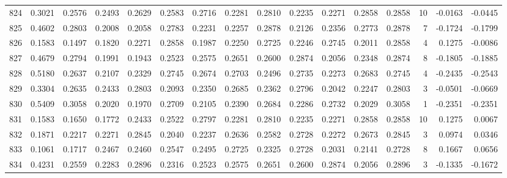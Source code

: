 \begin{tabular}{lrrrrrrrrrrrrrrr}
824 &      0.3021 &  0.2576 &  0.2493 &  0.2629 &  0.2583 &  0.2716 &  0.2281 &  0.2810 &  0.2235 &  0.2271 &   0.2858 &     0.2858 &     10 &                   -0.0163 &                    -0.0445 \\
825 &      0.4602 &  0.2803 &  0.2008 &  0.2058 &  0.2783 &  0.2231 &  0.2257 &  0.2878 &  0.2126 &  0.2356 &   0.2773 &     0.2878 &      7 &                   -0.1724 &                    -0.1799 \\
826 &      0.1583 &  0.1497 &  0.1820 &  0.2271 &  0.2858 &  0.1987 &  0.2250 &  0.2725 &  0.2246 &  0.2745 &   0.2011 &     0.2858 &      4 &                    0.1275 &                    -0.0086 \\
827 &      0.4679 &  0.2794 &  0.1991 &  0.1943 &  0.2523 &  0.2575 &  0.2651 &  0.2600 &  0.2874 &  0.2056 &   0.2348 &     0.2874 &      8 &                   -0.1805 &                    -0.1885 \\
828 &      0.5180 &  0.2637 &  0.2107 &  0.2329 &  0.2745 &  0.2674 &  0.2703 &  0.2496 &  0.2735 &  0.2273 &   0.2683 &     0.2745 &      4 &                   -0.2435 &                    -0.2543 \\
829 &      0.3304 &  0.2635 &  0.2433 &  0.2803 &  0.2093 &  0.2350 &  0.2685 &  0.2362 &  0.2796 &  0.2042 &   0.2247 &     0.2803 &      3 &                   -0.0501 &                    -0.0669 \\
830 &      0.5409 &  0.3058 &  0.2020 &  0.1970 &  0.2709 &  0.2105 &  0.2390 &  0.2684 &  0.2286 &  0.2732 &   0.2029 &     0.3058 &      1 &                   -0.2351 &                    -0.2351 \\
831 &      0.1583 &  0.1650 &  0.1772 &  0.2433 &  0.2522 &  0.2797 &  0.2281 &  0.2810 &  0.2235 &  0.2271 &   0.2858 &     0.2858 &     10 &                    0.1275 &                     0.0067 \\
832 &      0.1871 &  0.2217 &  0.2271 &  0.2845 &  0.2040 &  0.2237 &  0.2636 &  0.2582 &  0.2728 &  0.2272 &   0.2673 &     0.2845 &      3 &                    0.0974 &                     0.0346 \\
833 &      0.1061 &  0.1717 &  0.2467 &  0.2460 &  0.2547 &  0.2495 &  0.2725 &  0.2325 &  0.2728 &  0.2031 &   0.2141 &     0.2728 &      8 &                    0.1667 &                     0.0656 \\
834 &      0.4231 &  0.2559 &  0.2283 &  0.2896 &  0.2316 &  0.2523 &  0.2575 &  0.2651 &  0.2600 &  0.2874 &   0.2056 &     0.2896 &      3 &                   -0.1335 &                    -0.1672 \\

\end{tabular}
